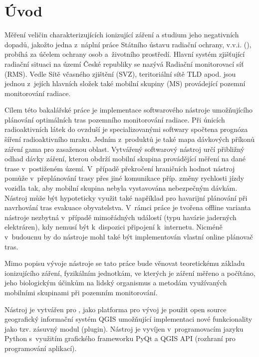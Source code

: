 \chapter{Úvod}
\label{1-uvod}
Měření veličin charakterizujících ionizující záření a studium jeho negativních dopadů, jakožto jedna z~náplní práce Státního ústavu radiační ochrany, v.v.i. (), probíhá za účelem ochrany osob a~životního prostředí. 
Hlavní systém zjišťující radiační situaci na území České republiky se nazývá Radiační monitorovací síť (RMS). Vedle Sítě včasného zjištění (SVZ), teritoriální sítě TLD apod. jsou jednou z~jejích hlavních složek také mobilní skupiny (MS) provádející pozemní monitorování radiace. \cite{suroRMS}

Cílem této bakalářské práce je implementace softwarového nástroje umožňujícího plánování optimálních tras pozemního monitorování radiace. Při únicích radioaktivních látek do ovzduší je specializovanými softwary spočtena prognóza šíření radioaktivního mraku. Jedním z~produktů je také mapa dávkových příkonů záření gama pro zasaženou oblast. Vytvářený softwarový nástroj určí přibližný odhad dávky záření, kterou obdrží mobilní skupina provádějící měření na dané trase v~postiženém území. V~případě překročení hraničních hodnot nástroj pomůže v~přeplánování trasy přes jiné komunikace příp. změny rychlosti jízdy vozidla tak, aby mobilní skupina nebyla vystavována nebezpečným dávkám. 
Nástroj může být hypoteticky využit také například pro havarijní plánování při navrhování tras evakuace obyvatelstva. V~rámci práce je tvořena offline varianta nástroje nezbytná v~případě mimořádných událostí (typu havárie jaderných elektráren), kdy nemusí být k~dispozici připojení k~internetu. Nicméně v~budoucnu by do nástroje mohl také být implementován vlastní online plánovač tras. 

Mimo popisu vývoje nástroje se tato práce bude věnovat teoretickému základu ionizujícího záření, fyzikálním jednotkám, ve kterých je záření měřeno a počítáno, jeho biologickým účinkům na lidský organismus a metodám využívaných mobilními skupinami při pozemním monitorování. 

Nástroj je vytvářen pro , jako platforma pro vývoj je použit open source geografický informační systém QGIS umožňující implementaci nové funkcionality jako tzv. zásuvný modul (plugin). Nástroj je vyvíjen v~programovacím jazyku Python s~využitím grafického frameworku PyQt a QGIS API (rozhraní pro programování aplikací).    






